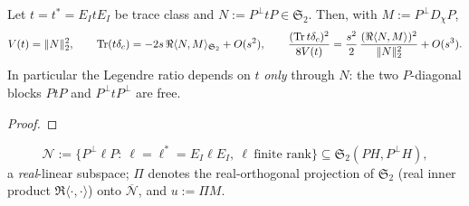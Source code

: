 \documentclass[11pt]{article}
\begin{document}
\begin{lemma}\label{lem:offdiag}
Let $t=t^*=E_ItE_I$ be trace class and $N:=P^\perp tP\in\mathfrak S_2$.  Then, with
$M:=P^\perp D_\chi P$,
\begin{equation}\label{eq:ratio}
 V(t)=\|N\|_2^2,\qquad \operatorname{Tr}(t\delta_c)=-2s\,\Re\langle N,M\rangle_{\mathfrak S_2}+O(s^2),
 \qquad
 \frac{(\operatorname{Tr} t\delta_c)^2}{8V(t)}=\frac{s^2}{2}\,\frac{(\Re\langle N,M\rangle)^2}{\|N\|_2^2}+O(s^3).
\end{equation}
In particular the Legendre ratio depends on $t$ \emph{only} through $N$: the two
$P$-diagonal blocks $PtP$ and $P^\perp tP^\perp$ are free.
\end{lemma}
\begin{proof}
\end{proof}

\begin{definition}\label{def:visible}
\begin{equation}\label{eq:NN}
 \mathcal N:=\bigl\{P^\perp\ell P:\ \ell=\ell^*=E_I\ell E_I,\ \ell\ \text{finite rank}\bigr\}
 \subseteq\mathfrak S_2(PH,P^\perp H),
\end{equation}
a \emph{real}-linear subspace; $\Pi$ denotes the real-orthogonal projection of
$\mathfrak S_2$ (real inner product $\Re\langle\cdot,\cdot\rangle$) onto
$\overline{\mathcal N}$, and $u:=\Pi M$.
\end{definition}
\end{document}

